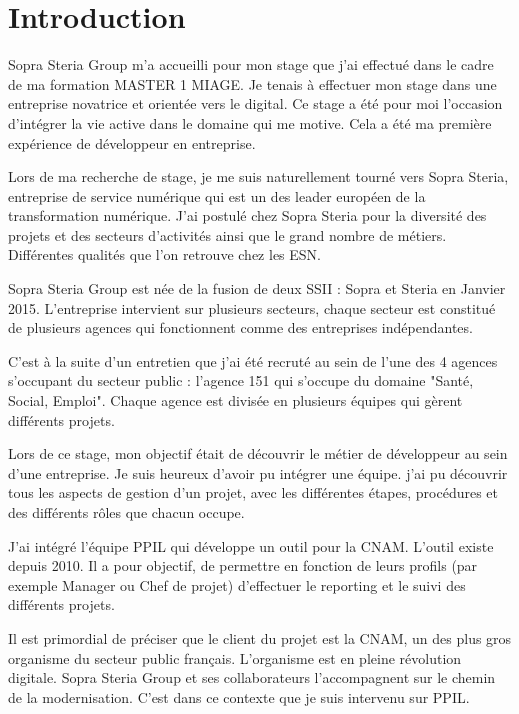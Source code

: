 \chapter*{Introduction}
\label{chap:introduction}

Sopra Steria Group m'a accueilli pour mon stage que j'ai effectué dans le cadre de ma formation MASTER 1 MIAGE. Je tenais à effectuer mon stage dans une entreprise novatrice et orientée vers le digital. Ce stage a été pour moi l'occasion d'intégrer la vie active dans le domaine qui me motive. Cela a été ma première expérience de développeur en entreprise.

Lors de ma recherche de stage, je me suis naturellement tourné vers Sopra Steria, entreprise de service numérique qui est un des leader européen de la transformation numérique.
J'ai postulé chez Sopra Steria pour la diversité des projets et des secteurs d'activités ainsi que le grand nombre de métiers. Différentes qualités que l'on retrouve chez les ESN. 

Sopra Steria Group est née de la fusion de deux SSII : Sopra et Steria en Janvier 2015.
L'entreprise intervient sur plusieurs secteurs, chaque secteur est constitué de plusieurs agences qui fonctionnent comme des entreprises indépendantes. 

C'est à la suite d’un entretien que j'ai été recruté au sein de l’une des 4 agences s'occupant du secteur public : l’agence 151 qui s’occupe du domaine "Santé, Social, Emploi".
Chaque agence est divisée en plusieurs équipes qui gèrent différents projets.

Lors de ce stage, mon objectif était de découvrir le métier de développeur au sein d'une entreprise. Je suis heureux d'avoir pu intégrer une équipe. j'ai pu découvrir tous les aspects de gestion d'un projet, avec les différentes étapes, procédures et des différents rôles que chacun occupe.

J'ai intégré l'équipe PPIL qui développe un outil pour la CNAM. L'outil existe depuis 2010. Il a pour objectif, de permettre en fonction de leurs profils (par exemple Manager ou Chef de projet) d'effectuer le reporting et le suivi des différents projets. 

Il est primordial de préciser que le client du projet est la CNAM, un des plus gros organisme du secteur public français. L'organisme est en pleine révolution digitale. Sopra Steria Group et ses collaborateurs l’accompagnent sur le chemin de la modernisation. C’est dans ce contexte que je suis intervenu sur PPIL. 

